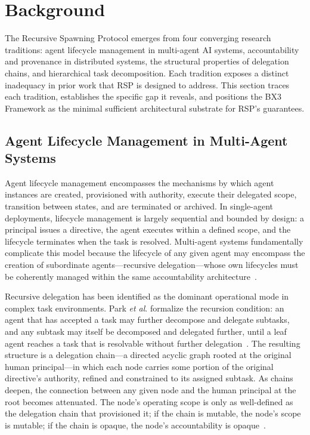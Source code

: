 \section{Background}
\label{sec:rs-background}

The Recursive Spawning Protocol emerges from four converging research traditions: agent lifecycle management in multi-agent AI systems, accountability and provenance in distributed systems, the structural properties of delegation chains, and hierarchical task decomposition. Each tradition exposes a distinct inadequacy in prior work that RSP is designed to address. This section traces each tradition, establishes the specific gap it reveals, and positions the BX3 Framework as the minimal sufficient architectural substrate for RSP's guarantees.

\subsection{Agent Lifecycle Management in Multi-Agent Systems}
\label{sec:rs-agent-lifecycle}

Agent lifecycle management encompasses the mechanisms by which agent instances are created, provisioned with authority, execute their delegated scope, transition between states, and are terminated or archived. In single-agent deployments, lifecycle management is largely sequential and bounded by design: a principal issues a directive, the agent executes within a defined scope, and the lifecycle terminates when the task is resolved. Multi-agent systems fundamentally complicate this model because the lifecycle of any given agent may encompass the creation of subordinate agents---recursive delegation---whose own lifecycles must be coherently managed within the same accountability architecture~\cite{intelligent_ai_delegation}.

Recursive delegation has been identified as the dominant operational mode in complex task environments. Park \textit{et al}. formalize the recursion condition: an agent that has accepted a task may further decompose and delegate subtasks, and any subtask may itself be decomposed and delegated further, until a leaf agent reaches a task that is resolvable without further delegation~\cite{arxiv2602.11865}. The resulting structure is a delegation chain---a directed acyclic graph rooted at the original human principal---in which each node carries some portion of the original directive's authority, refined and constrained to its assigned subtask. As chains deepen, the connection between any given node and the human principal at the root becomes attenuated. The node's operating scope is only as well-defined as the delegation chain that provisioned it; if the chain is mutable, the node's scope is mutable; if the chain is opaque, the node's accountability is opaque~\cite{zylos_hierarchical_coordination}.

